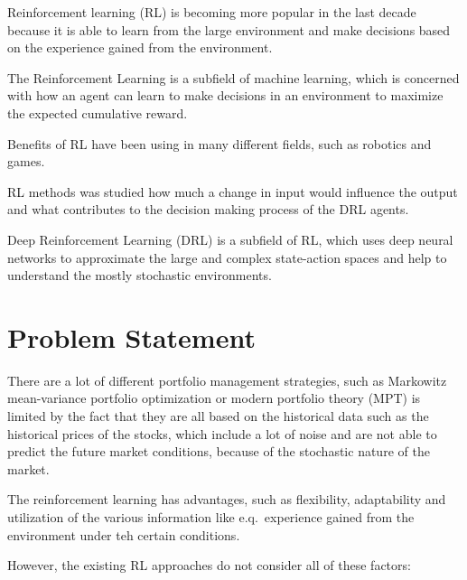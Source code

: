 Reinforcement learning (RL) is becoming more popular in the last decade because it
is able to learn from the large
environment and make decisions based on the
experience gained from the environment.

The Reinforcement Learning is a
subfield of machine learning, which is
concerned with how an agent can learn to make decisions in an
environment to maximize the expected cumulative reward.\cite{Model-Free-Reinforcement-Learning-for-Asset-Allocation}

Benefits of RL have been using in many different
fields, such as robotics and games.

RL methods was studied how much a change
in input would influence the output and
what contributes to the decision making process of the DRL agents.\cite{finrl-portfolio-allocation-2020}

Deep Reinforcement Learning (DRL) is a subfield of RL, which uses deep neural
networks to approximate the large and complex state-action spaces and
help to understand the mostly stochastic environments.


\section{Problem Statement}\label{sec:problem-statement}
There are a lot of different portfolio management strategies, such as
Markowitz mean-variance portfolio optimization
or modern portfolio theory (MPT)\cite{modern-portfolio-theory} is
limited by the fact that they are all based on the historical data such as
the historical prices of the stocks, which include a lot of noise and are not
able to predict the future market conditions, because of the stochastic nature
of the market.

The reinforcement learning has advantages, such as flexibility, adaptability and
utilization of the various information like e.q.\ experience gained from the environment
under teh certain conditions.

However, the existing RL approaches do not consider all of these factors:


